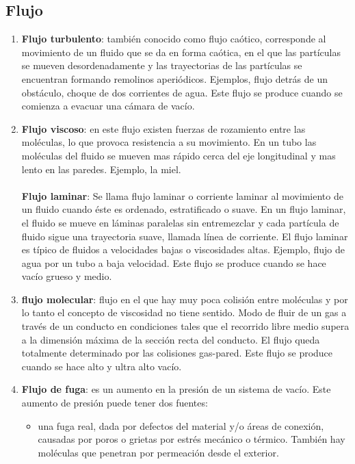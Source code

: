 \subsection{Flujo}
\begin{enumerate}[resume]
    \item %
    \textbf{Flujo turbulento}: también conocido como flujo caótico, corresponde al movimiento de un fluido que se da en forma caótica, en el que las partículas se mueven desordenadamente y las trayectorias de las partículas se encuentran formando remolinos aperiódicos. Ejemplos, flujo detrás de un obstáculo, choque de dos corrientes de agua. Este flujo se produce cuando se comienza a evacuar una cámara de vacío.
    
    \item %
    \textbf{Flujo viscoso}: en este flujo existen fuerzas de rozamiento entre las moléculas, lo que provoca resistencia a su movimiento. En un tubo las moléculas del fluido se mueven mas rápido cerca del eje longitudinal y mas lento en las paredes. Ejemplo, la miel.
    \\ \\
    \textbf{Flujo laminar}: Se llama flujo laminar o corriente laminar al movimiento de un fluido cuando éste es ordenado, estratificado o suave. En un flujo laminar, el fluido se mueve en láminas paralelas sin entremezclar y cada partícula de fluido sigue una trayectoria suave, llamada línea de corriente. El flujo laminar es típico de fluidos a velocidades bajas o viscosidades altas. Ejemplo, flujo de agua por un tubo a baja velocidad.
    Este flujo se produce cuando se hace vacío grueso y medio.

    \item %
    \textbf{flujo molecular}: flujo en el que hay muy poca colisión entre moléculas y por lo tanto el concepto de viscosidad no tiene sentido. Modo de fluir de un gas a través de un conducto en condiciones tales que el recorrido libre medio supera a la dimensión máxima de la sección recta del conducto. El flujo queda totalmente determinado por las colisiones gas-pared. Este flujo se produce cuando se hace alto y ultra alto vacío.
    

    \item %
    \textbf{Flujo de fuga}:
    es un aumento en la presión de un sistema de vacío. Este aumento de presión puede tener dos fuentes:
    \begin{itemize}
        \item una fuga real, dada por defectos del material y/o áreas de conexión, causadas por poros o grietas por estrés mecánico o térmico. También hay moléculas que penetran por permeación desde el exterior.
        

\end{itemize}
\end{enumerate}
